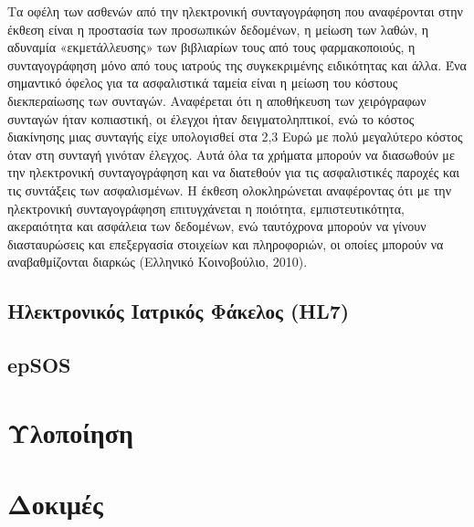 
Τα οφέλη των ασθενών από την ηλεκτρονική συνταγογράφηση που αναφέρονται στην έκθεση είναι η προστασία των προσωπικών δεδομένων, η μείωση των λαθών, η αδυναμία «εκμετάλλευσης» των βιβλιαρίων τους από τους φαρμακοποιούς, η συνταγογράφηση μόνο από τους ιατρούς της συγκεκριμένης ειδικότητας και άλλα.
Ένα σημαντικό όφελος για τα ασφαλιστικά ταμεία είναι η μείωση του κόστους διεκπεραίωσης των συνταγών. Αναφέρεται ότι η αποθήκευση των χειρόγραφων συνταγών ήταν κοπιαστική, οι έλεγχοι ήταν δειγματοληπτικοί, ενώ το κόστος διακίνησης μιας συνταγής είχε υπολογισθεί στα 2,3 Ευρώ με πολύ μεγαλύτερο κόστος όταν στη συνταγή γινόταν έλεγχος. Αυτά όλα τα χρήματα μπορούν να διασωθούν με την ηλεκτρονική συνταγογράφηση και να διατεθούν για τις ασφαλιστικές παροχές και τις συντάξεις των ασφαλισμένων.
Η έκθεση ολοκληρώνεται αναφέροντας ότι με την ηλεκτρονική συνταγογράφηση επιτυγχάνεται η ποιότητα, εμπιστευτικότητα, ακεραιότητα και ασφάλεια των δεδομένων, ενώ ταυτόχρονα μπορούν να γίνουν διασταυρώσεις και επεξεργασία στοιχείων και πληροφοριών, οι οποίες μπορούν να αναβαθμίζονται διαρκώς (Ελληνικό Κοινοβούλιο, 2010).	
	
	
	
	\subsection{Ηλεκτρονικός Ιατρικός Φάκελος (HL7)}
	
	
	
	
	
	
	
	\subsection{epSOS}

\section{Υλοποίηση}
\section{Δοκιμές}

